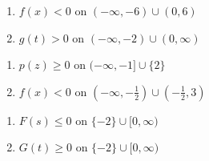 \documentclass{ximera}
\begin{document}
\begin{multicols}{2}
\begin{enumerate}
\setcounter{enumi}{\value{HW}}

\item $f(x) < 0$ on $(-\infty, -6) \cup (0, 6)$

\item $g(t) > 0$ on $(-\infty, -2) \cup (0, \infty)$

\setcounter{HW}{\value{enumi}}
\end{enumerate}
\end{multicols}

\begin{multicols}{2}
\begin{enumerate}
\setcounter{enumi}{\value{HW}}

\item $p(z) \geq 0$ on $(-\infty, -1] \cup \{ 2\}$

\item $f(x) < 0$ on $\left( -\infty, -\frac{1}{2} \right) \cup \left(-\frac{1}{2}, 3 \right)$

\setcounter{HW}{\value{enumi}}
\end{enumerate}
\end{multicols}

\begin{multicols}{2}
\begin{enumerate}
\setcounter{enumi}{\value{HW}}

\item $F(s) \leq 0$ on $\{-2\} \cup [0, \infty)$

\item $G(t) \geq 0$ on $\{-2\} \cup [0, \infty)$

\setcounter{HW}{\value{enumi}}
\end{enumerate}
\end{multicols}
\end{document}
